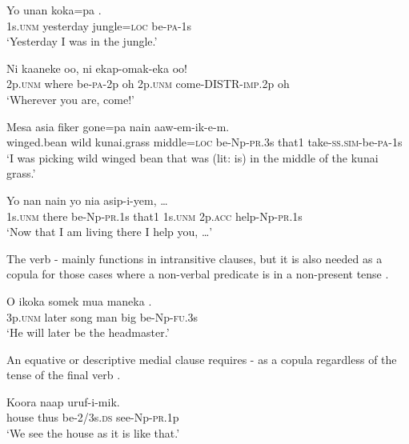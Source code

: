 \ea%
\label{ex:3:x263}
\gll Yo unan koka=pa . \\
1s.\textsc{unm} yesterday jungle=\textsc{loc} be-\textsc{pa}-1s \\
\glt`Yesterday I was in the jungle.' 
\z

\ea%
\label{ex:3:x264}
\gll Ni kaaneke  oo, ni ekap-omak-eka oo! \\
2p.\textsc{unm} where be-\textsc{pa}-2p oh 2p.\textsc{unm} come-DISTR-\textsc{imp}.2p oh \\
\glt`Wherever you are, come!'
\z

\ea%
\label{ex:3:x1028}
\gll Mesa asia fiker gone=pa  nain aaw-em-ik-e-m.\\
winged.bean wild kunai.grass middle=\textsc{loc} be-Np-\textsc{pr}.3s that1 take-\textsc{ss}.\textsc{sim}-be-\textsc{pa}-1s\\
\glt`I was picking wild winged bean that was (lit: is) in the middle of the kunai grass.'
\z

\ea%
\label{ex:3:x265}
\gll Yo nan  nain yo nia asip-i-yem, {\dots} \\
1s.\textsc{unm} there be-Np-\textsc{pr}.1s that1 1s.\textsc{unm} 2p.\textsc{acc} help-Np-\textsc{pr}.1s\\
\glt`Now that I am living there I help you, {\dots}'
\z

The verb - mainly functions in intransitive clauses, but it is also needed as a copula for those cases where a non-verbal predicate is in a non-present tense  . 

\ea%
\label{ex:3:x969}
\gll O ikoka somek mua maneka . \\
3p.\textsc{unm} later song man big be-Np-\textsc{fu}.3s\\
\glt`He will later be the headmaster.'
\z

An equative or descriptive medial clause requires - as a copula regardless of the tense of the final verb .

\ea%
\label{ex:3:x498}
\gll Koora naap  uruf-i-mik. \\
house thus be-2/3s.\textsc{ds} see-Np-\textsc{pr}.1p\\
\glt`We see the house as it is like that.'
\z

